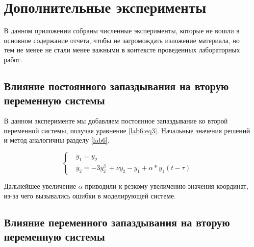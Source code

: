 \chapter{Дополнительные эксперименты}

В данном приложении собраны численные эксперименты, которые
не вошли в основное содержание отчета, чтобы не загромождать
изложение материала, но тем не менее не стали менее важными
в контексте проведенных лабораторных работ.

\section{Влияние постоянного запаздывания на вторую
переменную системы}\label{app:const}

В данном эксперименте мы добавляем постоянное запаздывание
ко второй переменной системы, получая уравнение \ref{lab6:eq3}.
Начальные значения решений и метод аналогичны разделу \ref{lab6}.

\begin{equation}\label{lab6:eq3}
    \begin{cases}
        &\dot{y_1} = y_2\\
        &\dot{y_2} = -3y_2^3\ + \nu y_2 - y_1  + \alpha * y_1(t-\tau)
    \end{cases}
\end{equation}

\clearpage
{}
Дальнейшее увеличение $\alpha$ приводили к резкому увеличению значения координат,
из-за чего вызывались ошибки в моделирующей системе.

\clearpage
\section{Влияние переменного запаздывания на вторую
переменную системы}

